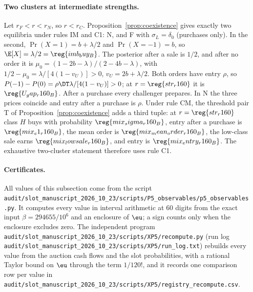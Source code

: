 \paragraph{Two clusters at intermediate strengths.}
Let \(r_F<r<r_N\), so \(r<r_C\). Proposition~\ref{prop:coexistence} gives exactly two equilibria under rules IM and C1:
N, and F with \(\sigma_L=\delta_0\) (purchases only). In the second, \(\Pr(X=1)=b+\lambda/2\) and \(\Pr(X=-1)=b\), so
\(\E[X]=\lambda/2=\reg{imb_buy_B}\). The posterior after a sale is \(1/2\), and after no order it is
\(\mu_0=(1-2b-\lambda)/(2-4b-\lambda)\), with \(1/2-\mu_0=\lambda/[4(1-v_U)]>0\), \(v_U=2b+\lambda/2\). Both orders have
entry \(\rho\), so \(P(-1)-P(0)=\rho\DT\lambda/[4(1-v_U)]>0\); at \(r=\reg{str_r160}\) it is \(\reg{U_gap_r160_B}\). After a
purchase every challenger prepares. In N the three prices coincide and entry after a purchase is \(\rho\). Under rule
CM, the threshold pair T of Proposition~\ref{prop:coexistence} adds a third tuple: at \(r=\reg{str_r160}\) class \(H\)
buys with probability \(\reg{mix_sigma_r160_B}\), entry after a purchase is \(\reg{mix_e1_r160_B}\), the mean order is
\(\reg{mix_mean_order_r160_B}\), the low-class sale earns \(\reg{mix_lowsale_r160_B}\), and entry is
\(\reg{mix_entry_r160_B}\). The exhaustive two-cluster statement therefore uses rule C1.

\paragraph{Certificates.}
All values of this subsection come from the script
\nolinkurl{audit/slot_manuscript_2026_10_23/scripts/P5_observables/p5_observables.py}. It computes every value in
interval arithmetic at 60 digits from the exact input \(\beta=294655/10^6\) and an enclosure of \(\eu\); a sign counts only
when the enclosure excludes zero. The independent program
\nolinkurl{audit/slot_manuscript_2026_10_23/scripts/XP5/recompute.py} (run log
\nolinkurl{audit/slot_manuscript_2026_10_23/scripts/XP5/run_log.txt}) rebuilds every value from the auction cash flows
and the slot probabilities, with a rational Taylor bound on \(\eu\) through the term \(1/120!\), and it records one
comparison row per value in \nolinkurl{audit/slot_manuscript_2026_10_23/scripts/XP5/registry_recompute.csv}.
